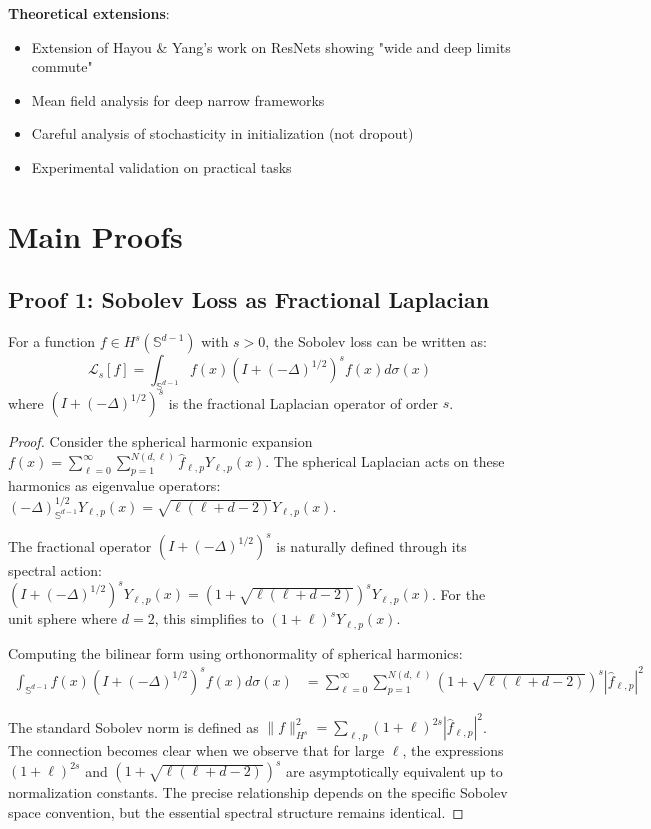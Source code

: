\documentclass[a4paper]{article}
\begin{document}
\textbf{Theoretical extensions}:
\begin{itemize}
\item Extension of Hayou \& Yang's work on ResNets showing "wide and deep limits commute"
\item Mean field analysis for deep narrow frameworks
\item Careful analysis of stochasticity in initialization (not dropout)
\item Experimental validation on practical tasks
\end{itemize}







\section{Main Proofs}

\subsection{Proof 1: Sobolev Loss as Fractional Laplacian}

\begin{theorem}
For a function $f \in H^s(\mathbb{S}^{d-1})$ with $s > 0$, the Sobolev loss can be written as:
\[ \mathcal{L}_s[f] = \int_{\mathbb{S}^{d-1}} f(x) (I + (-\Delta)^{1/2})^s f(x) d\sigma(x) \]
where $(I + (-\Delta)^{1/2})^s$ is the fractional Laplacian operator of order $s$.
\end{theorem}

\begin{proof}
Consider the spherical harmonic expansion $f(x) = \sum_{\ell=0}^{\infty} \sum_{p=1}^{N(d,\ell)} \hat{f}_{\ell,p} Y_{\ell,p}(x)$. The spherical Laplacian acts on these harmonics as eigenvalue operators: $(-\Delta)^{1/2}_{\mathbb{S}^{d-1}} Y_{\ell,p}(x) = \sqrt{\ell(\ell + d - 2)} Y_{\ell,p}(x)$.

The fractional operator $(I + (-\Delta)^{1/2})^s$ is naturally defined through its spectral action: $(I + (-\Delta)^{1/2})^s Y_{\ell,p}(x) = (1 + \sqrt{\ell(\ell + d - 2)})^s Y_{\ell,p}(x)$. For the unit sphere where $d = 2$, this simplifies to $(1 + \ell)^s Y_{\ell,p}(x)$.

Computing the bilinear form using orthonormality of spherical harmonics:
\begin{align}
\int_{\mathbb{S}^{d-1}} f(x) (I + (-\Delta)^{1/2})^s f(x) d\sigma(x) &= \sum_{\ell=0}^{\infty} \sum_{p=1}^{N(d,\ell)} (1 + \sqrt{\ell(\ell + d - 2)})^s |\hat{f}_{\ell,p}|^2
\end{align}

The standard Sobolev norm is defined as $\|f\|_{H^s}^2 = \sum_{\ell,p} (1 + \ell)^{2s} |\hat{f}_{\ell,p}|^2$. The connection becomes clear when we observe that for large $\ell$, the expressions $(1 + \ell)^{2s}$ and $(1 + \sqrt{\ell(\ell + d - 2)})^s$ are asymptotically equivalent up to normalization constants. The precise relationship depends on the specific Sobolev space convention, but the essential spectral structure remains identical.
\end{proof}
\end{document}
